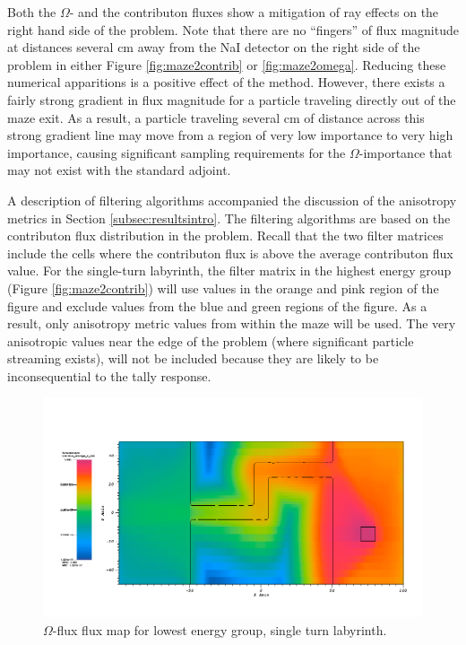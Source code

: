 Both the $\Omega$- and the contributon fluxes show a mitigation of ray effects
on the right hand side of the problem. Note that there are no ``fingers'' of
flux magnitude at distances several cm away from the NaI detector on the right
side of the problem in either Figure \ref{fig:maze2contrib} or
\ref{fig:maze2omega}. Reducing these numerical apparitions is a positive effect
of the method. However, there exists a fairly strong gradient in flux magnitude
for a particle traveling directly out of the maze exit. As a result, a particle
traveling several cm of distance across this strong gradient line may move from
a region of very low importance to very high importance, causing 
significant sampling requirements for the $\Omega$-importance that may not exist
with the standard adjoint.

A description of filtering algorithms accompanied
the discussion of the anisotropy metrics in Section
\ref{subsec:resultsintro}. The filtering algorithms are based on the contributon
flux distribution in the problem. Recall that the two
filter matrices include the cells where the contributon flux
is above the average contributon flux value. For the single-turn labyrinth, the filter matrix in the
highest energy group (Figure \ref{fig:maze2contrib}) will use values in the
orange and pink region of the figure and exclude values from the blue and green
regions of the figure. As a result, only anisotropy metric values from within
the maze will be used. The very anisotropic values near the edge of the problem
(where significant particle streaming exists), will not be included because they
are likely to be inconsequential to the tally response.

\begin{figure}[h!]
  \centering
    \includegraphics[width=0.9\linewidth]{./chapters/characterization_probs/figures/char/maze2/maze2MomegaG26.png}
    \caption{$\Omega$-flux flux map for lowest energy group, single turn
    labyrinth.}
    \label{fig:maze2omega26}
\end{figure}

